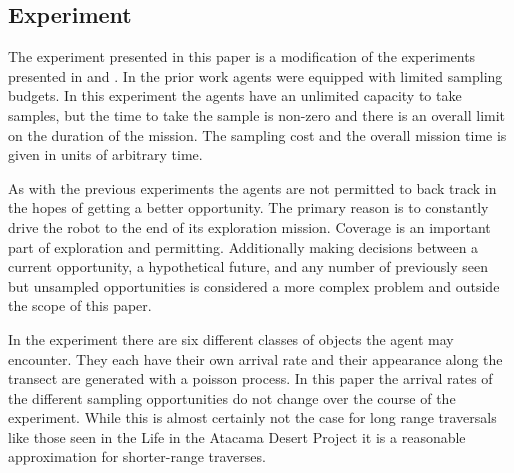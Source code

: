 \subsection{Experiment}


The experiment presented in this paper is a modification of the experiments
presented in \cite{furlong2014sequential} and \cite{furlong2014budgeting}.  In
the prior work agents were equipped with limited sampling budgets.  In this
experiment the agents have an unlimited capacity to take samples, but the time
to take the sample is non-zero and there is an overall limit on the duration of
the mission.  The sampling cost and the overall mission time is given in units of arbitrary time.

As with the previous experiments the agents are not permitted to back track in
the hopes of getting a better opportunity.  The primary reason is to constantly
drive the robot to the end of its exploration mission.  Coverage is an
important part of exploration and permitting.  Additionally making decisions
between a current opportunity, a hypothetical future, and any number of
previously seen but unsampled opportunities is considered a more complex
problem and outside the scope of this paper.

In the experiment there are six different classes of objects the agent may
encounter.  They each have their own arrival rate and their appearance along
the transect are generated with a poisson process.  In this paper the arrival
rates of the different sampling opportunities do not change over the course of
the experiment.  While this is almost certainly not the case for long range
traversals like those seen in the Life in the Atacama Desert Project it is a
reasonable approximation for shorter-range traverses.

